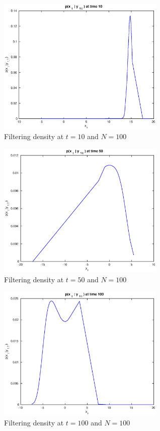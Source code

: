 \documentclass[11pt, english]{article}
\begin{document}
\begin{figure}[h]
  
  \centering
    \includegraphics[width=80mm]{./figs/005_13_t10.eps}
    \caption{Filtering density at $t=10$ and $N=100$}
    \label{t10}
\end{figure}

\begin{figure}[h]
  
  \centering
    \includegraphics[width=80mm]{./figs/006_13_t50.eps}
    \caption{Filtering density at $t=50$ and $N=100$}
    \label{t50}
\end{figure}

\begin{figure}[h]
  
  \centering
    \includegraphics[width=80mm]{./figs/007_13_t100.eps}
    \caption{Filtering density at $t=100$ and $N=100$}
    \label{t100}
\end{figure}
\end{document}
